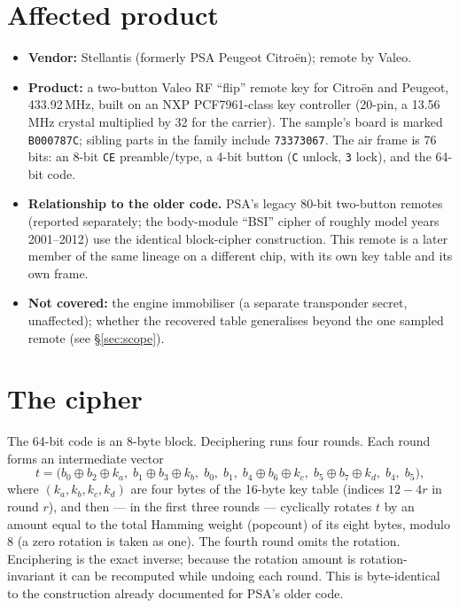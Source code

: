 \documentclass[11pt,a4paper]{article}
\newcommand{\hex}[1]{\texttt{#1}}
\begin{document}
\section{Affected product}
\begin{itemize}
\item \textbf{Vendor:} Stellantis (formerly PSA Peugeot Citro\"en); remote by Valeo.
\item \textbf{Product:} a two-button Valeo RF ``flip'' remote key for Citro\"en and Peugeot, 433.92\,MHz, built on an NXP PCF7961-class key controller (20-pin, a 13.56\,MHz crystal multiplied by 32 for the carrier). The sample's board is marked \hex{B000787C}; sibling parts in the family include \hex{73373067}. The air frame is 76 bits: an 8-bit \hex{CE} preamble/type, a 4-bit button (\hex{C} unlock, \hex{3} lock), and the 64-bit code.
\item \textbf{Relationship to the older code.} PSA's legacy 80-bit two-button remotes (reported separately; the body-module ``BSI'' cipher of roughly model years 2001--2012) use the identical block-cipher construction. This remote is a later member of the same lineage on a different chip, with its own key table and its own frame.
\item \textbf{Not covered:} the engine immobiliser (a separate transponder secret, unaffected); whether the recovered table generalises beyond the one sampled remote (see \S\ref{sec:scope}).
\end{itemize}

\section{The cipher}
The 64-bit code is an 8-byte block. Deciphering runs four rounds. Each round forms an intermediate vector
\[
t = \bigl(b_0\!\oplus\! b_2\!\oplus\! k_a,\; b_1\!\oplus\! b_3\!\oplus\! k_b,\; b_0,\; b_1,\; b_4\!\oplus\! b_6\!\oplus\! k_c,\; b_5\!\oplus\! b_7\!\oplus\! k_d,\; b_4,\; b_5\bigr),
\]
where $(k_a,k_b,k_c,k_d)$ are four bytes of the 16-byte key table (indices $12\!-\!4r$ in round $r$), and then --- in the first three rounds --- cyclically rotates $t$ by an amount equal to the total Hamming weight (popcount) of its eight bytes, modulo 8 (a zero rotation is taken as one). The fourth round omits the rotation. Enciphering is the exact inverse; because the rotation amount is rotation-invariant it can be recomputed while undoing each round. This is byte-identical to the construction already documented for PSA's older code.
\end{document}
